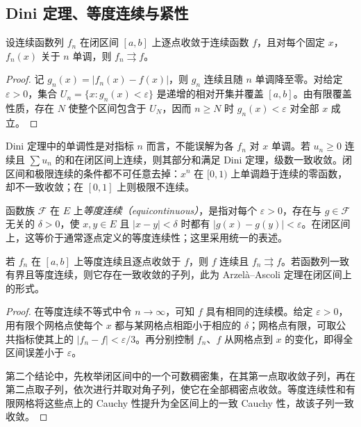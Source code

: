 \subsection{Dini 定理、等度连续与紧性}

\begin{theorem}[Dini 定理]
\label{thm:pei-dini}
设连续函数列 $f_n$ 在闭区间 $[a,b]$ 上逐点收敛于连续函数 $f$，且对每个固定 $x$，$f_n(x)$ 关于 $n$ 单调，则 $f_n\rightrightarrows f$。
\end{theorem}
\begin{proof}
记 $g_n(x)=|f_n(x)-f(x)|$，则 $g_n$ 连续且随 $n$ 单调降至零。对给定 $\varepsilon>0$，集合 $U_n=\{x:g_n(x)<\varepsilon\}$ 是递增的相对开集并覆盖 $[a,b]$。由有限覆盖性质，存在 $N$ 使整个区间包含于 $U_N$，因而 $n\geq N$ 时 $g_n(x)<\varepsilon$ 对全部 $x$ 成立。
\end{proof}

Dini 定理中的单调性是对指标 $n$ 而言，不能误解为各 $f_n$ 对 $x$ 单调。若 $u_n\geq0$ 连续且 $\sum u_n$ 的和在闭区间上连续，则其部分和满足 Dini 定理，级数一致收敛。闭区间和极限连续的条件都不可任意去掉：$x^n$ 在 $[0,1)$ 上单调趋于连续的零函数，却不一致收敛；在 $[0,1]$ 上则极限不连续。

\begin{definition}
函数族 $\mathcal F$ 在 $E$ 上\emph{等度连续（equicontinuous）}，是指对每个 $\varepsilon>0$，存在与 $g\in\mathcal F$ 无关的 $\delta>0$，使 $x,y\in E$ 且 $|x-y|<\delta$ 时都有 $|g(x)-g(y)|<\varepsilon$。在闭区间上，这等价于通常逐点定义的等度连续性；这里采用统一的表述。
\end{definition}

\begin{proposition}
\label{prop:pei-equicontinuity}
若 $f_n$ 在 $[a,b]$ 上等度连续且逐点收敛于 $f$，则 $f$ 连续且 $f_n\rightrightarrows f$。若函数列一致有界且等度连续，则它存在一致收敛的子列，此为 Arzelà--Ascoli 定理在闭区间上的形式。
\end{proposition}
\begin{proof}
在等度连续不等式中令 $n\to\infty$，可知 $f$ 具有相同的连续模。给定 $\varepsilon>0$，用有限个网格点使每个 $x$ 都与某网格点相距小于相应的 $\delta$；网格点有限，可取公共指标使其上的 $|f_n-f|<\varepsilon/3$。再分别控制 $f_n$、$f$ 从网格点到 $x$ 的变化，即得全区间误差小于 $\varepsilon$。

第二个结论中，先枚举闭区间中的一个可数稠密集，在其第一点取收敛子列，再在第二点取子列，依次进行并取对角子列，使它在全部稠密点收敛。等度连续性和有限网格将这些点上的 Cauchy 性提升为全区间上的一致 Cauchy 性，故该子列一致收敛。
\end{proof}

